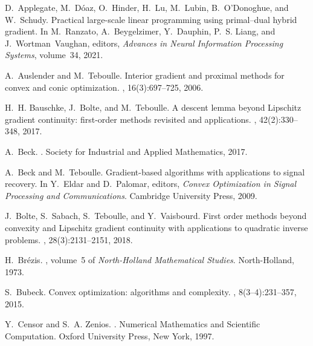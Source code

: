 \documentclass[letterpaper,11pt]{article}
\begin{document}
\begin{thebibliography}{10}

D.~Applegate, M.~D\'oaz, O.~Hinder, H.~Lu, M.~Lubin, B.~O'Donoghue, and
  W.~Schudy.
\newblock Practical large-scale linear programming using primal--dual hybrid
  gradient.
\newblock In M.~Ranzato, A.~Beygelzimer, Y.~Dauphin, P.~S. Liang, and
  J.~Wortman~Vaughan, editors, {\em Advances in Neural Information Processing
  Systems}, volume~34, 2021.

A.~Auslender and M.~Teboulle.
\newblock Interior gradient and proximal methods for convex and conic
  optimization.
, 16(3):697--725, 2006.

H.~H. Bauschke, J.~Bolte, and M.~Teboulle.
\newblock A descent lemma beyond {Lipschitz} gradient continuity: first-order
  methods revisited and applications.
, 42(2):330--348, 2017.

A.~Beck.
.
\newblock Society for Industrial and Applied Mathematics, 2017.

A.~Beck and M.~Teboulle.
\newblock Gradient-based algorithms with applications to signal recovery.
\newblock In Y.~Eldar and D.~Palomar, editors, {\em Convex Optimization in
  Signal Processing and Communications}. Cambridge University Press, 2009.

J.~Bolte, S.~Sabach, S.~Teboulle, and Y.~Vaisbourd.
\newblock First order methods beyond convexity and {Lipschitz} gradient
  continuity with applications to quadratic inverse problems.
, 28(3):2131--2151, 2018.

H.~Br{\'e}zis.
, volume~5 of {\em North-Holland Mathematical
  Studies}.
\newblock North-Holland, 1973.

S.~Bubeck.
\newblock Convex optimization: algorithms and complexity.
, 8(3--4):231--357,
  2015.

Y.~Censor and S.~A. Zenios.
.
\newblock Numerical Mathematics and Scientific Computation. Oxford University
  Press, New York, 1997.


\end{thebibliography}
\end{document}
